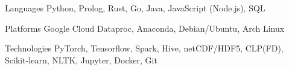 \begin{cvskills}

\cvskill
    {Languages}
    {Python, Prolog, Rust, Go, Java, JavaScript (Node.js), SQL}

\cvskill
    {Platforms}
    {Google Cloud Dataproc, Anaconda, Debian/Ubuntu, Arch Linux}

\cvskill
    {Technologies}
    {PyTorch, Tensorflow, Spark, Hive, netCDF/HDF5, CLP(FD), Scikit-learn, NLTK, Jupyter, Docker, Git}

\end{cvskills}
